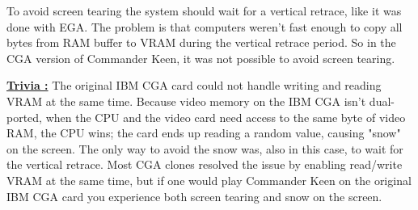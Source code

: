 \documentclass[book.tex]{subfiles}
\begin{document}
\par
To avoid screen tearing the system should wait for a vertical retrace, like it was done with EGA. The problem is that computers weren't fast enough to copy all bytes from RAM buffer to VRAM during the vertical retrace period. So in the CGA version of Commander Keen, it was not possible to avoid screen tearing.\\

\par
\begin{minipage}{\textwidth}
  
\end{minipage}
\label{cga_screen_refresh}
\par

\pagebreak
\textbf{\underline{Trivia :}} The original IBM CGA card could not handle writing and reading VRAM at the same time. Because video memory on the IBM CGA isn't dual-ported, when the CPU and the video card need access to the same byte of video RAM, the CPU wins; the card ends up reading a random value, causing "snow" on the screen. The only way to avoid the snow was, also in this case, to wait for the vertical retrace. Most CGA clones resolved the issue by enabling read/write VRAM at the same time, but if one would play Commander Keen on the original IBM CGA card you experience both screen tearing and snow on the screen.\\
\par
\end{document}
